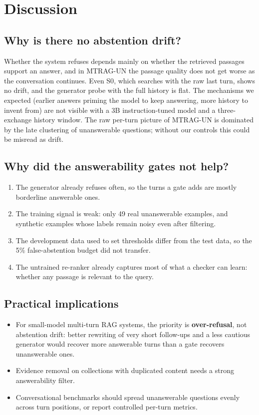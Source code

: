 \documentclass[11pt,a4paper]{report}
\newcommand{\sys}[1]{\textsf{#1}}
\begin{document}
\chapter{Discussion}
\section{Why is there no abstention drift?}
Whether the system refuses depends mainly on whether the retrieved passages support an answer, and in MTRAG-UN the passage quality does not get worse as the conversation continues. Even \sys{S0}, which searches with the raw last turn, shows no drift, and the generator probe with the full history is flat. The mechanisms we expected (earlier answers priming the model to keep answering, more history to invent from) are not visible with a 3B instruction-tuned model and a three-exchange history window. The raw per-turn picture of MTRAG-UN is dominated by the late clustering of unanswerable questions; without our controls this could be misread as drift.

\section{Why did the answerability gates not help?}
\begin{enumerate}
\item The generator already refuses often, so the turns a gate adds are mostly borderline answerable ones.
\item The training signal is weak: only 49 real unanswerable examples, and synthetic examples whose labels remain noisy even after filtering.
\item The development data used to set thresholds differ from the test data, so the 5\% false-abstention budget did not transfer.
\item The untrained re-ranker already captures most of what a checker can learn: whether any passage is relevant to the query.
\end{enumerate}

\section{Practical implications}
\begin{itemize}
\item For small-model multi-turn RAG systems, the priority is \textbf{over-refusal}, not abstention drift: better rewriting of very short follow-ups and a less cautious generator would recover more answerable turns than a gate recovers unanswerable ones.
\item Evidence removal on collections with duplicated content needs a strong answerability filter.
\item Conversational benchmarks should spread unanswerable questions evenly across turn positions, or report controlled per-turn metrics.
\end{itemize}
\end{document}
